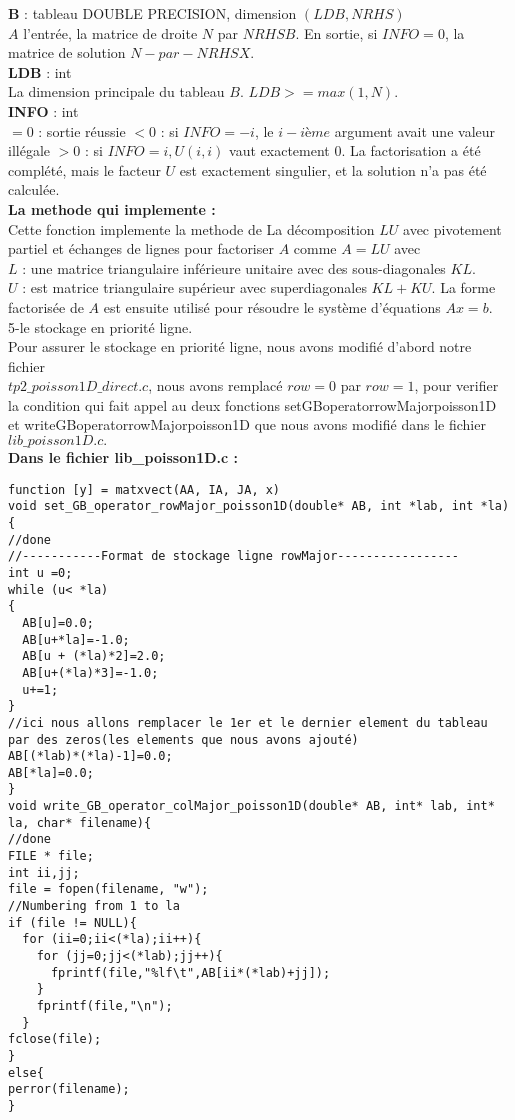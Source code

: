 \documentclass[12pt]{report}
\begin{document}
\textbf{B} : tableau DOUBLE PRECISION, dimension $(LDB,NRHS)$\\

$A$ l'entrée, la matrice de droite $N$ par $NRHS B$.
En sortie, si $INFO = 0$, la matrice de solution $N-par-NRHS X$.\\

\textbf{LDB} : int\\
La dimension principale du tableau $B$. $LDB >= max(1,N)$.\\

\textbf{INFO} : int\\
$= 0$ : sortie réussie
$< 0$ : si $INFO = -i$, le $i-ième$ argument avait une valeur illégale
$> 0$ : si $INFO = i, U(i,i)$ vaut exactement $0$. La factorisation a été complété, mais le facteur $U$ est exactement singulier, et la solution n'a pas été calculée.\\

\textbf{La methode qui implemente :}\\

Cette fonction implemente la methode de La décomposition $LU$ avec pivotement partiel et échanges de lignes pour factoriser $A$ comme $A = LU$ avec\\
$L$ : une matrice triangulaire inférieure unitaire avec des sous-diagonales $KL$.\\
$U$ : est matrice triangulaire supérieur avec superdiagonales $KL+KU$. 
La forme factorisée de $A$
est ensuite utilisé pour résoudre le système d'équations $Ax=b$.\\

5-le stockage en priorité ligne.\\

Pour assurer le stockage en priorité ligne, nous avons modifié d'abord notre fichier\\ $tp2\_poisson1D\_direct.c$, nous avons remplacé $row=0$ par $row=1$, pour verifier la condition qui fait appel au deux fonctions setGBoperatorrowMajorpoisson1D et writeGBoperatorrowMajorpoisson1D  que nous avons modifié dans le fichier $lib\_poisson1D.c.$ \\

\textbf{Dans le fichier lib\_poisson1D.c :}

\begin{lstlisting}
function [y] = matxvect(AA, IA, JA, x)
void set_GB_operator_rowMajor_poisson1D(double* AB, int *lab, int *la)
{
//done
//-----------Format de stockage ligne rowMajor-----------------
int u =0;
while (u< *la)
{
  AB[u]=0.0;
  AB[u+*la]=-1.0;
  AB[u + (*la)*2]=2.0;
  AB[u+(*la)*3]=-1.0;
  u+=1;
}
//ici nous allons remplacer le 1er et le dernier element du tableau par des zeros(les elements que nous avons ajouté) 
AB[(*lab)*(*la)-1]=0.0;
AB[*la]=0.0;
}
void write_GB_operator_colMajor_poisson1D(double* AB, int* lab, int* la, char* filename){
//done
FILE * file;
int ii,jj;
file = fopen(filename, "w");
//Numbering from 1 to la
if (file != NULL){
  for (ii=0;ii<(*la);ii++){
    for (jj=0;jj<(*lab);jj++){
      fprintf(file,"%lf\t",AB[ii*(*lab)+jj]);
    }
    fprintf(file,"\n");
  }
fclose(file);
}
else{
perror(filename);
}
\end{lstlisting}
\end{document}

